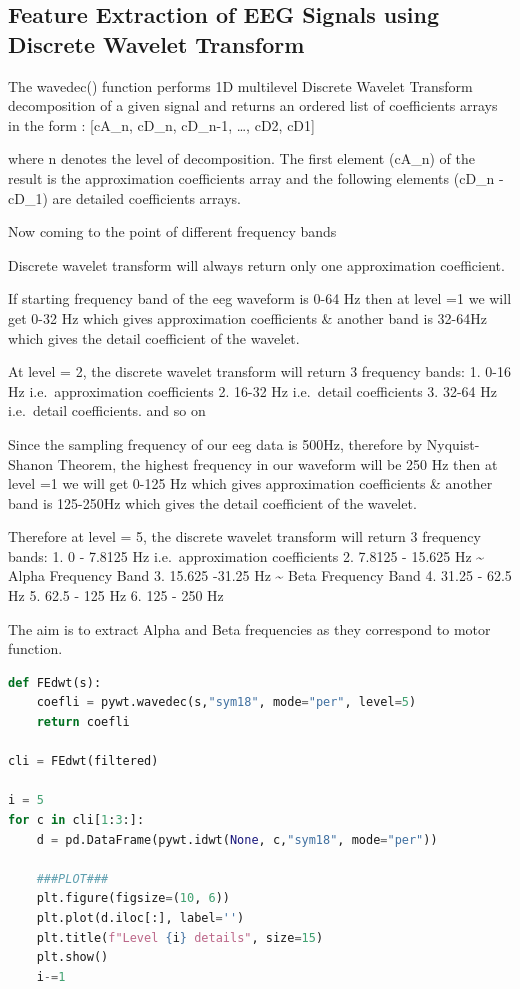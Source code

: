 \hypertarget{feature-extraction-of-eeg-signals-using-discrete-wavelet-transform}{%
\subsection{Feature Extraction of EEG Signals using Discrete Wavelet
Transform}\label{feature-extraction-of-eeg-signals-using-discrete-wavelet-transform}}

The wavedec() function performs 1D multilevel Discrete Wavelet Transform
decomposition of a given signal and returns an ordered list of
coefficients arrays in the form : {[}cA\_n, cD\_n, cD\_n-1, \ldots, cD2,
cD1{]}

where n denotes the level of decomposition. The first element (cA\_n) of
the result is the approximation coefficients array and the following
elements (cD\_n - cD\_1) are detailed coefficients arrays.

Now coming to the point of different frequency bands

Discrete wavelet transform will always return only one approximation
coefficient.

If starting frequency band of the eeg waveform is 0-64 Hz then at level
=1 we will get 0-32 Hz which gives approximation coefficients \& another
band is 32-64Hz which gives the detail coefficient of the wavelet.

At level = 2, the discrete wavelet transform will return 3 frequency
bands: 1. 0-16 Hz i.e.~approximation coefficients 2. 16-32 Hz
i.e.~detail coefficients 3. 32-64 Hz i.e.~detail coefficients. and so on

Since the sampling frequency of our eeg data is 500Hz, therefore by
Nyquist-Shanon Theorem, the highest frequency in our waveform will be
250 Hz then at level =1 we will get 0-125 Hz which gives approximation
coefficients \& another band is 125-250Hz which gives the detail
coefficient of the wavelet.

Therefore at level = 5, the discrete wavelet transform will return 3
frequency bands: 1. 0 - 7.8125 Hz i.e.~approximation coefficients 2.
7.8125 - 15.625 Hz \textasciitilde{} Alpha Frequency Band 3. 15.625
-31.25 Hz \textasciitilde{} Beta Frequency Band 4. 31.25 - 62.5 Hz 5.
62.5 - 125 Hz 6. 125 - 250 Hz

The aim is to extract Alpha and Beta frequencies as they correspond to
motor function.

\begin{lstlisting}[language=Python]
def FEdwt(s):
    coefli = pywt.wavedec(s,"sym18", mode="per", level=5)
    return coefli

cli = FEdwt(filtered)

i = 5
for c in cli[1:3:]:
    d = pd.DataFrame(pywt.idwt(None, c,"sym18", mode="per"))
    
    ###PLOT###
    plt.figure(figsize=(10, 6))
    plt.plot(d.iloc[:], label='')
    plt.title(f"Level {i} details", size=15)
    plt.show()
    i-=1
\end{lstlisting}

